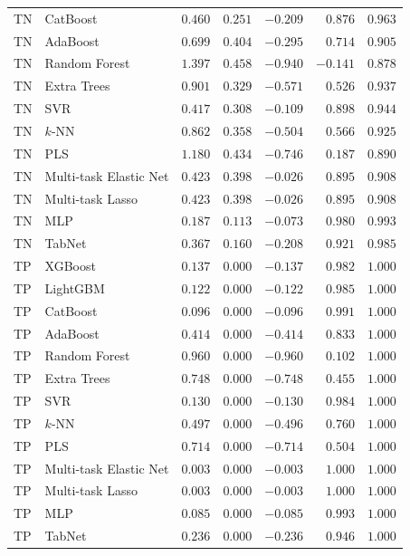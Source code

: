 \begin{longtable}{lp{3.1cm}rrrrr}
TN & CatBoost & $0.460$ & $0.251$ & $-0.209$ & $0.876$ & $0.963$ \\
TN & AdaBoost & $0.699$ & $0.404$ & $-0.295$ & $0.714$ & $0.905$ \\
TN & Random Forest & $1.397$ & $0.458$ & $-0.940$ & $-0.141$ & $0.878$ \\
TN & Extra Trees & $0.901$ & $0.329$ & $-0.571$ & $0.526$ & $0.937$ \\
TN & SVR & $0.417$ & $0.308$ & $-0.109$ & $0.898$ & $0.944$ \\
TN & $k$-NN & $0.862$ & $0.358$ & $-0.504$ & $0.566$ & $0.925$ \\
TN & PLS & $1.180$ & $0.434$ & $-0.746$ & $0.187$ & $0.890$ \\
TN & Multi-task Elastic Net & $0.423$ & $0.398$ & $-0.026$ & $0.895$ & $0.908$ \\
TN & Multi-task Lasso & $0.423$ & $0.398$ & $-0.026$ & $0.895$ & $0.908$ \\
TN & MLP & $0.187$ & $0.113$ & $-0.073$ & $0.980$ & $0.993$ \\
TN & TabNet & $0.367$ & $0.160$ & $-0.208$ & $0.921$ & $0.985$ \\
TP & XGBoost & $0.137$ & $0.000$ & $-0.137$ & $0.982$ & $1.000$ \\
TP & LightGBM & $0.122$ & $0.000$ & $-0.122$ & $0.985$ & $1.000$ \\
TP & CatBoost & $0.096$ & $0.000$ & $-0.096$ & $0.991$ & $1.000$ \\
TP & AdaBoost & $0.414$ & $0.000$ & $-0.414$ & $0.833$ & $1.000$ \\
TP & Random Forest & $0.960$ & $0.000$ & $-0.960$ & $0.102$ & $1.000$ \\
TP & Extra Trees & $0.748$ & $0.000$ & $-0.748$ & $0.455$ & $1.000$ \\
TP & SVR & $0.130$ & $0.000$ & $-0.130$ & $0.984$ & $1.000$ \\
TP & $k$-NN & $0.497$ & $0.000$ & $-0.496$ & $0.760$ & $1.000$ \\
TP & PLS & $0.714$ & $0.000$ & $-0.714$ & $0.504$ & $1.000$ \\
TP & Multi-task Elastic Net & $0.003$ & $0.000$ & $-0.003$ & $1.000$ & $1.000$ \\
TP & Multi-task Lasso & $0.003$ & $0.000$ & $-0.003$ & $1.000$ & $1.000$ \\
TP & MLP & $0.085$ & $0.000$ & $-0.085$ & $0.993$ & $1.000$ \\
TP & TabNet & $0.236$ & $0.000$ & $-0.236$ & $0.946$ & $1.000$ \\

\end{longtable}
